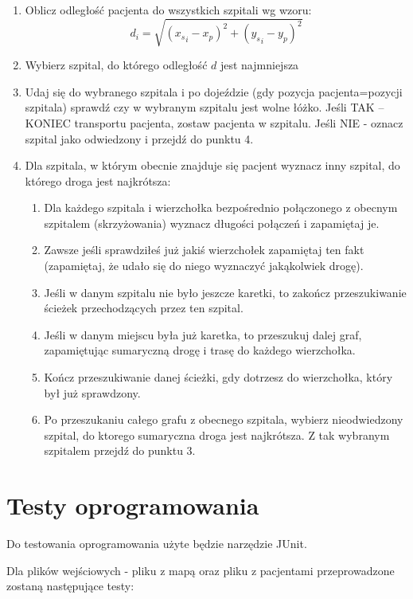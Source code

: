 \documentclass[10pt,a4paper]{article}
\begin{document}
\begin{enumerate}
    \item Oblicz odległość pacjenta do wszystkich szpitali wg wzoru:
    $$d_i=\sqrt{({x_s}_i-x_p)^2+({y_s}_i-y_p)^2}$$
    \item Wybierz szpital, do którego odległość $d$ jest najmniejsza
    \item Udaj się do wybranego szpitala i po dojeździe (gdy pozycja pacjenta=pozycji szpitala) sprawdź czy w wybranym szpitalu jest wolne łóżko. Jeśli TAK – KONIEC transportu pacjenta, zostaw pacjenta w szpitalu. Jeśli NIE - oznacz szpital jako odwiedzony i przejdź do punktu 4.
    \item Dla szpitala, w którym obecnie znajduje się pacjent wyznacz inny szpital, do którego droga jest najkrótsza:
    \begin{enumerate}[4.1.]
        \item Dla każdego szpitala i wierzchołka bezpośrednio połączonego z obecnym szpitalem (skrzyżowania) wyznacz długości połączeń i zapamiętaj je.
        \item Zawsze jeśli sprawdziłeś już jakiś wierzchołek zapamiętaj ten fakt (zapamiętaj, że udało się do niego wyznaczyć jakąkolwiek drogę).
        \item Jeśli w danym szpitalu nie było jeszcze karetki, to zakończ przeszukiwanie ścieżek przechodzących przez ten szpital.
        \item Jeśli w danym miejscu była już karetka, to przeszukuj dalej graf, zapamiętując sumaryczną drogę i trasę do każdego wierzchołka.
        \item Kończ przeszukiwanie danej ścieżki, gdy dotrzesz do wierzchołka, który był już sprawdzony.
        \item Po przeszukaniu całego grafu z obecnego szpitala, wybierz nieodwiedzony szpital, do ktorego sumaryczna droga jest najkrótsza. Z tak wybranym szpitalem przejdź do punktu 3. 
    \end{enumerate}
\end{enumerate}

\section{Testy oprogramowania}

Do testowania oprogramowania użyte będzie narzędzie JUnit.

Dla plików wejściowych - pliku z mapą oraz pliku z pacjentami przeprowadzone zostaną następujące testy:
 
\end{document}
